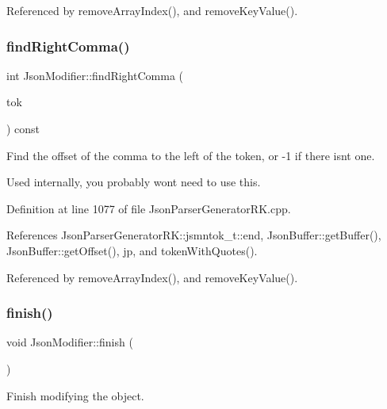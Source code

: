 Referenced by remove\+Array\+Index(), and remove\+Key\+Value().

\mbox{\label{class_json_modifier_a24fac4c2257f932aff41792214de35ca}} 
\subsubsection{\texorpdfstring{find\+Right\+Comma()}{findRightComma()}}
{\footnotesize\ttfamily int Json\+Modifier\+::find\+Right\+Comma (\begin{DoxyParamCaption}\item[{const \hyperlink{struct_json_parser_generator_r_k_1_1jsmntok__t}{Json\+Parser\+Generator\+R\+K\+::jsmntok\+\_\+t} $\ast$}]{tok }\end{DoxyParamCaption}) const}



Find the offset of the comma to the left of the token, or -\/1 if there isn\textquotesingle{}t one. 

Used internally, you probably won\textquotesingle{}t need to use this. 

Definition at line 1077 of file Json\+Parser\+Generator\+R\+K.\+cpp.



References Json\+Parser\+Generator\+R\+K\+::jsmntok\+\_\+t\+::end, Json\+Buffer\+::get\+Buffer(), Json\+Buffer\+::get\+Offset(), jp, and token\+With\+Quotes().



Referenced by remove\+Array\+Index(), and remove\+Key\+Value().

\mbox{\label{class_json_modifier_ae531232fa98f72eea8ea6ba07c065497}} 
\subsubsection{\texorpdfstring{finish()}{finish()}}
{\footnotesize\ttfamily void Json\+Modifier\+::finish (\begin{DoxyParamCaption}{ }\end{DoxyParamCaption})}



Finish modifying the object. 

